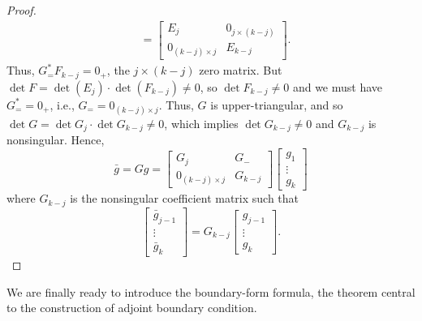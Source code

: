 \documentclass[11pt, oneside, a4paper]{article}
\begin{document}
\begin{proof}
\begin{align*}
    &= \begin{bmatrix}
        E_j & 0_{j\times (k-j)}\\
        0_{(k-j)\times j} & E_{k-j}
    \end{bmatrix}.
\end{align*}
Thus, $G^*_=F_{k-j}=0_+$, the $j\times (k-j)$ zero matrix. But $\det F = \det(E_j)\cdot \det(F_{k-j})\neq 0$, so $\det F_{k-j}\neq 0$ and we must have $G^*_==0_+$, i.e., $G_= =0_{(k-j)\times j}$. Thus, $G$ is upper-triangular, and so $\det G = \det G_j \cdot \det G_{k-j}\neq 0$, which implies $\det G_{k-j}\neq 0$ and $G_{k-j}$ is nonsingular. Hence,
\[\bar{g} = Gg = \begin{bmatrix}G_j & G_-\\
0_{(k-j)\times j} & G_{k-j}\end{bmatrix} \begin{bmatrix}
g_1\\
\vdots\\
g_k
\end{bmatrix}\]
where $G_{k-j}$ is the nonsingular coefficient matrix such that
\[\begin{bmatrix}
    \bar{g}_{j-1}\\
    \vdots\\
    \bar{g}_{k}
\end{bmatrix} = G_{k-j}\begin{bmatrix}
    g_{j-1}\\
    \vdots\\
    g_{k}
\end{bmatrix}.\]
\end{proof}

We are finally ready to introduce the boundary-form formula, the theorem central to the construction of adjoint boundary condition.
\end{document}
